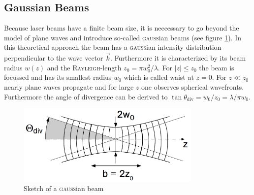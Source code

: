 \documentclass{protokoll_en}
\begin{document}
\subsection{Gaussian Beams}
\label{cha:gauss}
Because laser beams have a finite beam size, it is neccessary to go beyond the model of plane waves and introduce so-called \textsc{gauss}ian beams (see figure \ref{fig:gaussianbeams}). In this theoretical approach the beam has a \textsc{gauss}ian intensity distribution perpendicular to the wave vector $\vec{k}$. Furthermore it is characterized by its beam radius $w(z)$ and the \textsc{Rayleigh}-length $z_0 = \pi w^2_0/\lambda$. For $|z| \leq z_0$ the beam is focussed and has its smallest radius $w_0$ which is called waist at $z=0$. For $z \ll z_0$ nearly plane waves propagate and for large $z$ one observes spherical wavefronts. Furthermore the angle of divergence can be derived to $\tan{\theta_{\mathrm{div}}} = w_0/z_0 = \lambda/\pi w_0$.
\begin{figure}[H]
	\centering
		\includegraphics[width=0.8\textwidth]{graphics/gaussianbeams}
	\caption{Sketch of a \textsc{gauss}ian beam~\cite{meschi}}
	\label{fig:gaussianbeams}
\end{figure}
\end{document}
